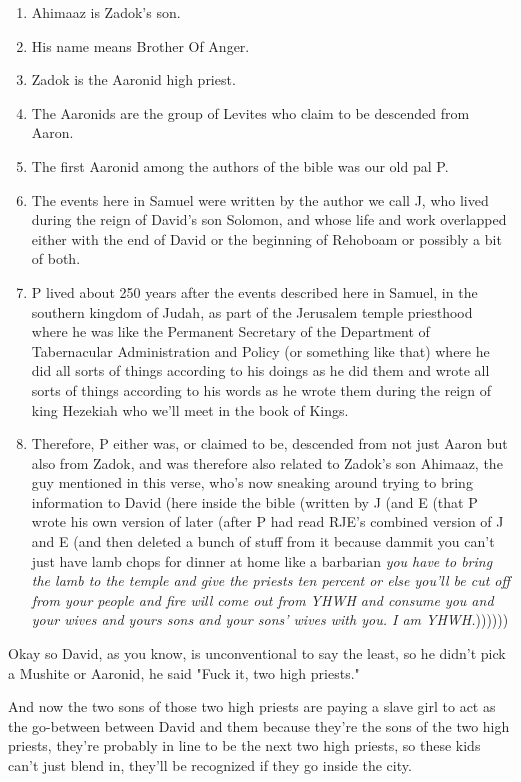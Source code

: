{	\begin{enumerate}
	\item Ahimaaz is Zadok's son.
	\item His name means Brother Of Anger.
	\item Zadok is the Aaronid high priest.
	\item The Aaronids are the group of Levites who claim to be descended from
	Aaron.
	\item The first Aaronid among the authors of the bible was our old pal P.
	\item The events here in Samuel were written by the author we call J, who
	lived during the reign of David's son Solomon, and whose life and work
	overlapped either with the end of David or the beginning of Rehoboam or
	possibly a bit of both.
	\item P lived about 250 years after the events described here in Samuel, in
	the southern kingdom of Judah, as part of the Jerusalem temple priesthood
	where he was like the Permanent Secretary of the Department of Tabernacular
	Administration and Policy (or something like that) where he did all sorts of
	things according to his doings as he did them and wrote all sorts of things
	according to his words as he wrote them during the reign of king Hezekiah
	who we'll meet in the book of Kings.
	\item Therefore, P either was, or claimed to be, descended from not just
	Aaron but also from Zadok, and was therefore also related to Zadok's son
	Ahimaaz, the guy mentioned in this verse, who's now sneaking around trying
	to bring information to David (here inside the bible (written by J (and E
	(that P wrote his own version of later (after P had read RJE's combined
	version of J and E (and then deleted a bunch of stuff from it because dammit
	you can't just have lamb chops for dinner at home like a barbarian \emph{you
	have to bring the lamb to the temple and give the priests ten percent or
	else you'll be cut off from your people and fire will come out from YHWH and
	consume you and your wives and yours sons and your sons' wives with you. I
	am YHWH.}))))))
	\end{enumerate}

	Okay so David, as you know, is unconventional to say the least, so he didn't
	pick a Mushite or Aaronid, he said "Fuck it, two high priests."

	And now the two sons of those two high priests are paying a slave girl to
	act as the go-between between David and them because they're the sons of the
	two high priests, they're probably in line to be the next two high priests,
	so these kids can't just blend in, they'll be recognized if they go inside
	the city.

}
